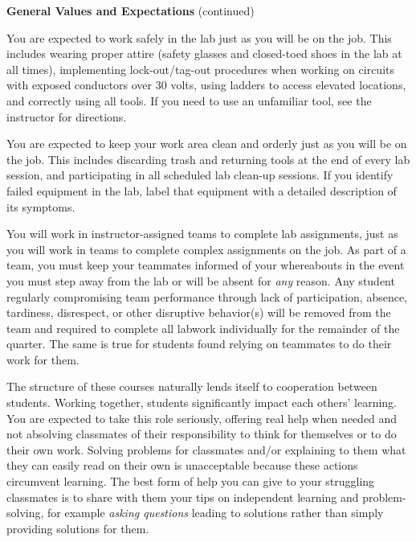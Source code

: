 \vfil \eject

\centerline{{\bf General Values and Expectations} (continued)} 


\vskip 10pt

\noindent
{} You are expected to work safely in the lab just as you will be on the job.  This includes wearing proper attire (safety glasses and closed-toed shoes in the lab at all times), implementing lock-out/tag-out procedures when working on circuits with exposed conductors over 30 volts, using ladders to access elevated locations, and correctly using all tools.  If you need to use an unfamiliar tool, see the instructor for directions.

\vskip 10pt

\noindent
{} You are expected to keep your work area clean and orderly just as you will be on the job.  This includes discarding trash and returning tools at the end of every lab session, and participating in all scheduled lab clean-up sessions.  If you identify failed equipment in the lab, label that equipment with a detailed description of its symptoms. 

\vskip 10pt

\noindent
{} You will work in instructor-assigned teams to complete lab assignments, just as you will work in teams to complete complex assignments on the job.  As part of a team, you must keep your teammates informed of your whereabouts in the event you must step away from the lab or will be absent for {\it any} reason.  Any student regularly compromising team performance through lack of participation, absence, tardiness, disrespect, or other disruptive behavior(s) will be removed from the team and required to complete all labwork individually for the remainder of the quarter.  The same is true for students found relying on teammates to do their work for them.

\vskip 10pt

\noindent
{} The structure of these courses naturally lends itself to cooperation between students.  Working together, students significantly impact each others' learning.  You are expected to take this role seriously, offering real help when needed and not absolving classmates of their responsibility to think for themselves or to do their own work.  Solving problems for classmates and/or explaining to them what they can easily read on their own is unacceptable because these actions circumvent learning.  The best form of help you can give to your struggling classmates is to share with them your tips on independent learning and problem-solving, for example {\it asking questions} leading to solutions rather than simply providing solutions for them.

